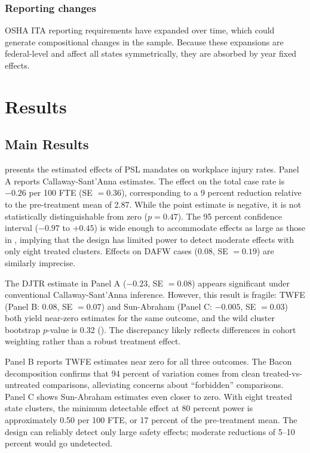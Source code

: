 \documentclass[12pt]{article}
\begin{document}
\subsubsection*{Reporting changes} OSHA ITA reporting requirements have expanded over time, which could generate compositional changes in the sample. Because these expansions are federal-level and affect all states symmetrically, they are absorbed by year fixed effects.


\section{Results}

\subsection{Main Results}

 presents the estimated effects of PSL mandates on workplace injury rates. Panel A reports Callaway-Sant'Anna estimates. The effect on the total case rate is $-0.26$ per 100 FTE (SE $= 0.36$), corresponding to a 9 percent reduction relative to the pre-treatment mean of 2.87. While the point estimate is negative, it is not statistically distinguishable from zero ($p = 0.47$). The 95 percent confidence interval ($-0.97$ to $+0.45$) is wide enough to accommodate effects as large as those in \citet{asfaw2012}, implying that the design has limited power to detect moderate effects with only eight treated clusters. Effects on DAFW cases ($0.08$, SE $= 0.19$) are similarly imprecise.

The DJTR estimate in Panel A ($-0.23$, SE $= 0.08$) appears significant under conventional Callaway-Sant'Anna inference. However, this result is fragile: TWFE (Panel B: $0.08$, SE $= 0.07$) and Sun-Abraham (Panel C: $-0.005$, SE $= 0.03$) both yield near-zero estimates for the same outcome, and the wild cluster bootstrap $p$-value is 0.32 (). The discrepancy likely reflects differences in cohort weighting rather than a robust treatment effect.

Panel B reports TWFE estimates near zero for all three outcomes. The Bacon decomposition confirms that 94 percent of variation comes from clean treated-vs-untreated comparisons, alleviating concerns about ``forbidden'' comparisons. Panel C shows Sun-Abraham estimates even closer to zero. With eight treated state clusters, the minimum detectable effect at 80 percent power is approximately 0.50 per 100 FTE, or 17 percent of the pre-treatment mean. The design can reliably detect only large safety effects; moderate reductions of 5--10 percent would go undetected.
\end{document}
